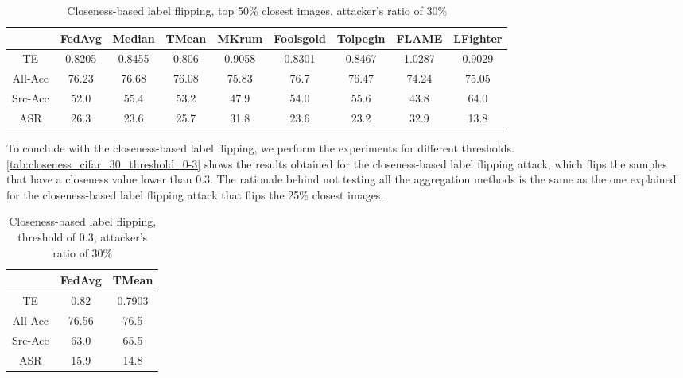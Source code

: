 \begin{table}[h!]
        \centering
        \small
        \begin{adjustbox}{center}
        \begin{tabular}{|c|c|c|c|c|c|c|c|c|}
            \hline
            & FedAvg & Median & TMean & MKrum & Foolsgold & Tolpegin & FLAME & LFighter \\
            \hline
            TE & 0.8205 & 0.8455 & 0.806 & 0.9058 & 0.8301 & 0.8467 & 1.0287 & 0.9029 \\
            \hline
            All-Acc & 76.23 & 76.68 & 76.08 & 75.83 & 76.7 & 76.47 & 74.24 & 75.05 \\
            \hline
            Src-Acc & 52.0 & 55.4 & 53.2 & 47.9 & 54.0 & 55.6 & 43.8 & 64.0 \\
            \hline
            ASR & 26.3 & 23.6 & 25.7 & 31.8 & 23.6 & 23.2 & 32.9 & 13.8 \\
            \hline
        \end{tabular}
        \end{adjustbox}
        \caption{Closeness-based label flipping, top 50\% closest images, attacker's ratio of 30\%}
        \label{tab:closeness_cifar_30_top_50}
    \end{table}
    


To conclude with the closeness-based label flipping, we perform the experiments for different thresholds. \autoref{tab:closeness_cifar_30_threshold_0-3} shows the results obtained for the closeness-based label flipping attack, which flips the samples that have a closeness value lower than 0.3. The rationale behind not testing all the aggregation methods is the same as the one explained for the closeness-based label flipping attack that flips the 25\% closest images.

\begin{table}[h!]
        \centering
        \small
        \begin{adjustbox}{center}
        \begin{tabular}{|c|c|c|}
            \hline
            & FedAvg & TMean \\
            \hline
            TE & 0.82 & 0.7903 \\
            \hline
            All-Acc & 76.56 & 76.5 \\
            \hline
            Src-Acc & 63.0 & 65.5 \\
            \hline
            ASR & 15.9 & 14.8 \\
            \hline
        \end{tabular}
        \end{adjustbox}
        \caption{Closeness-based label flipping, threshold of 0.3, attacker's ratio of 30\%}
        \label{tab:closeness_cifar_30_threshold_0-3}
    \end{table}
    
